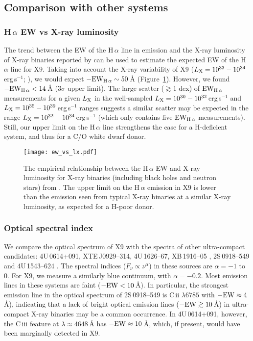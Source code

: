 \documentclass[a4paper,fleqn,usenatbib]{mnras}
\begin{document}
\subsection{Comparison with other systems}
\label{sec:compare}

\subsubsection{H\,$\alpha$ EW vs X-ray luminosity}

The trend between the EW of the H\,$\alpha$ line in emission and the X-ray luminosity of X-ray binaries reported by \citet{2009MNRAS.393.1608F} can be used to estimate the expected EW of the H\,$\alpha$ line for X9. Taking into account the X-ray variability of X9 ($L_{\rm X} = 10^{33} - 10^{34}$\,erg\,s$^{-1}$; \citealp{2017MNRAS.467.2199B}), we would expect $\rm -EW_{H\,\alpha} \sim 50$\,{\AA} (Figure~\ref{fig:ew_lx}). However, we found $\rm -EW_{H\,\alpha} < 14$\,{\AA} (3$\sigma$ upper limit). The large scatter ($\gtrsim 1$ dex) of $\rm EW_{H\,\alpha}$ measurements for a given $L_{\rm X}$ in the well-sampled $L_{\rm X} = 10^{30}-10^{32}$\,erg\,s$^{-1}$ and $L_{\rm X} = 10^{35}-10^{39}$\,erg\,s$^{-1}$ ranges suggests a similar scatter may be expected in the range $L_{\rm X} = 10^{32}-10^{34}$\,erg\,s$^{-1}$ (which only contains five $\rm EW_{H\,\alpha}$ measurements). Still, our upper limit on the H\,$\alpha$ line strengthens the case for a H-deficient system, and thus for a C/O white dwarf donor.

\begin{figure}
	\texttt{[image: ew\_vs\_lx.pdf]}
	\caption{The empirical relationship between the H\,$\alpha$ EW and X-ray luminosity for X-ray binaries (including black holes and neutron stars) from \citet{2009MNRAS.393.1608F}. The upper limit on the H\,$\alpha$ emission in X9 is lower than the emission seen from typical X-ray binaries at a similar X-ray luminosity, as expected for a H-poor donor.}
	\label{fig:ew_lx}
\end{figure}

\subsubsection{Optical spectral index}

We compare the optical spectrum of X9 with the spectra of other ultra-compact candidates: 4U\,0614+091, XTE\,J0929--314, 4U\,1626--67, XB\,1916--05 \citep{2006MNRAS.370..255N}, 2S\,0918--549 and 4U\,1543--624 \citep{2004MNRAS.348L...7N}. The spectral indices ($F_\nu \propto \nu^{\alpha}$) in these sources are $\alpha = -1$ to 0. For X9, we measure a similarly blue continuum, with $\alpha = -0.2$. Most emission lines in these systems are faint ($\rm -EW < 10$\,{\AA}). In particular, the strongest emission line in the optical spectrum of 2S\,0918--549 is C\,{\sc ii} $\lambda6785$ with $\rm -EW \approx 4$\,{\AA}), indicating that a lack of bright optical emission lines ($\rm -EW \gtrsim 10$\,{\AA}) in ultra-compact X-ray binaries may be a common occurrence. In 4U\,0614+091, however, the C\,{\sc iii} feature at $\lambda \approx 4648$\,{\AA} has $\rm -EW \approx 10$\,{\AA}, which, if present, would have been marginally detected in X9.
\end{document}
